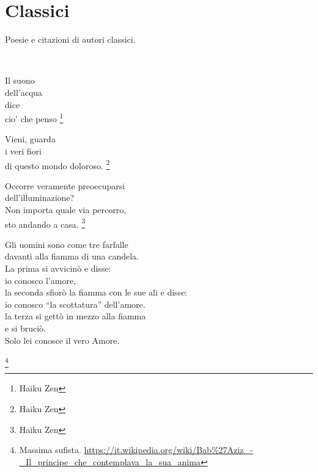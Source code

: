 \section{Classici}

Poesie e citazioni di autori classici.

\leavevmode\\[0.25in]

\vfill

\begin{haiku}
Il suono\\
dell'acqua\\
dice\\
cio' che penso \footnote{Haiku Zen}\\
\end{haiku}

\label{dolorosoMondo}
\begin{haiku}
Vieni, guarda\\
i veri fiori\\
di questo mondo doloroso.  \footnote{Haiku Zen}\\
\end{haiku}

\begin{haiku}
Occorre veramente preoccuparsi\\
dell'illuminazione?\\
Non importa quale via percorro,\\
sto andando a casa.  \footnote{Haiku Zen}\\
\end{haiku}

\begin{vcentered}
    \begin{poem}
Gli uomini sono come tre farfalle\\
davanti alla fiamma di una candela.\\
La prima si avvicinò e disse:\\
io conosco l'amore,\\
la seconda sfiorò la fiamma con le sue ali e disse:\\
io conosco ``la scottatura'' dell’amore.\\
la terza si gettò in mezzo alla fiamma\\
e si bruciò. \\
Solo lei conosce il vero Amore.\\
    \end{poem}
    \footnote{Massima sufista. \url{https://it.wikipedia.org/wiki/Bab\%27Aziz\_-\_Il\_principe\_che\_contemplava\_la\_sua\_anima}}
\end{vcentered}


